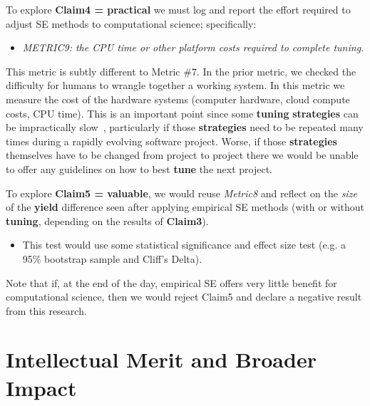 \documentclass{NSF}
\newenvironment{myitemize}
{ \begin{itemize}
    \setlength{\itemsep}{0pt}
    \setlength{\parskip}{0pt}
    \setlength{\parsep}{0pt}     }
{ \end{itemize}                  }
\newcommand{\bi}{\begin{myitemize}}
\newcommand{\ei}{\end{myitemize}}
\newcommand{\tbl}[1]{Table~\ref{tbl:#1}}
\begin{document}
\begin{nsfdescription}
To explore {\bf Claim4 = practical}
we must log and report the effort required to 
adjust SE methods to computational science; specifically:
\bi
\item {\em METRIC9: the CPU time or other platform  costs
required to complete tuning.}
\ei
This metric is subtly different to Metric \#7. In the prior metric, we checked
the difficulty for humans to wrangle together a working system. In this metric we 
measure the cost of the hardware systems (computer hardware,  cloud compute costs, CPU time).
This is an important point since some {\bf tuning}
{\bf strategies}
can be impractically slow~\cite{abs-1807-11112},
particularly if those {\bf strategies} need to be repeated
many times during a rapidly evolving software project.
Worse, if those {\bf strategies} themselves have
to be changed from project to project there we
would be unable to offer any guidelines on how to best
{\bf tune} the next project.

To explore  {\bf Claim5 = valuable}, we would reuse
{\em Metric8} and reflect on the 
  {\em size} of the {\bf yield} difference seen after
  applying empirical SE methods (with or without
  {\bf tuning}, depending on the results of {\bf Claim3}).
  \bi
  \item
  This test would use some statistical significance and
  effect size test (e.g. a 95\% bootstrap sample and Cliff's Delta).
  \ei
  Note that if,
  at the end of the day, empirical SE offers very
  little benefit for computational  science, then we would reject Claim5 and declare
  a negative result from this research.
  
  

% 
%
%

 

 

 
\newpage\section{Intellectual Merit and Broader Impact}
\label{sec:IM-BI}

\end{nsfdescription}
\end{document}
